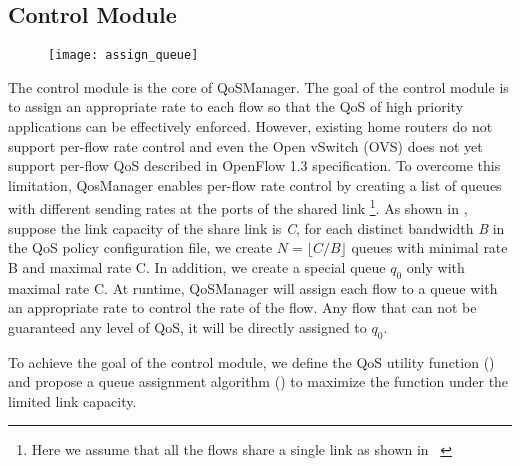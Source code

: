 %

\subsection{Control Module}

\begin{figure}[htb]
  \centering
  \texttt{[image: assign\_queue]}
  \caption{}
  \label{fig:assign_queue}
\end{figure}

The control module is the core of QoSManager. The goal of the control module is to assign an appropriate rate to each flow so that
the QoS of high priority applications can be effectively enforced. However, existing home routers do not support per-flow rate control
and even the Open vSwitch (OVS) does not yet support per-flow QoS described in OpenFlow 1.3 specification. To overcome
this limitation, QosManager enables per-flow rate control by creating a list of queues with different sending rates at the ports of
the shared link \footnote{Here we assume that all the flows share a single link as shown in ~}. As shown in ,
suppose the link capacity of the share link is \emph{C}, for each distinct bandwidth \emph{B} in the QoS policy configuration file,
we create $ N = \lfloor C / B \rfloor $ queues with minimal rate B and maximal rate C. In addition, we create a special queue $q_0$
only with maximal rate C. At runtime, QoSManager will assign each flow to a queue with an appropriate rate to control the rate of the
flow. Any flow that can not be guaranteed any level of QoS, it will be directly assigned to $q_0$.

To achieve the goal of the control module, we define the QoS utility function () and propose a queue assignment
algorithm () to maximize the function under the limited link capacity.

